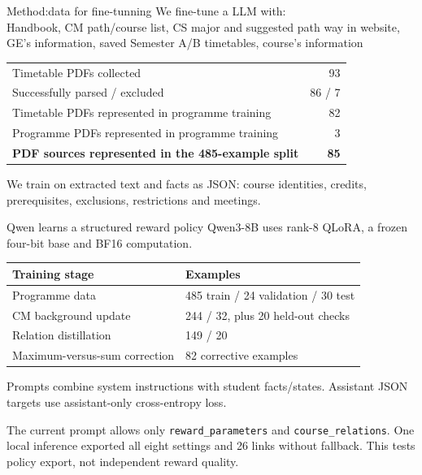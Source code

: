 \documentclass[aspectratio=169,11pt]{beamer}
\newcommand{\smallnote}[1]{\par{\footnotesize\color{muted}#1\par}}
\begin{document}
\begin{frame}{Method:data for fine-tunning}
We fine-tune a LLM with:\\
Handbook, CM path/course list, CS major and suggested path way in website, GE's information, saved Semester A/B timetables, course's information
\vspace{2mm}
\begin{tabular}{L{9.4cm}r}
\toprule
Timetable PDFs collected & 93\\
Successfully parsed / excluded & 86 / 7\\
Timetable PDFs represented in programme training & 82\\
Programme PDFs represented in programme training & 3\\\midrule
\textbf{PDF sources represented in the 485-example split} & \textbf{85}\\
\bottomrule
\end{tabular}\par
\vspace{2mm}
We train on extracted text and facts as JSON: course identities, credits, prerequisites, exclusions, restrictions and meetings.

\end{frame}

\begin{frame}{Qwen learns a structured reward policy}
Qwen3-8B uses rank-8 QLoRA, a frozen four-bit base and BF16 computation.
\vspace{1mm}
\begin{tabular}{L{7.5cm}L{4.8cm}}
\toprule
Training stage & Examples\\\midrule
Programme data & 485 train / 24 validation / 30 test\\
CM background update & 244 / 32, plus 20 held-out checks\\
Relation distillation & 149 / 20\\
Maximum-versus-sum correction & 82 corrective examples\\
\bottomrule
\end{tabular}\par
\vspace{2mm}
Prompts combine system instructions with student facts/states. Assistant JSON targets use assistant-only cross-entropy loss.
\smallnote{The current prompt allows only \texttt{reward\_parameters} and \texttt{course\_relations}. One local inference exported all eight settings and 26 links without fallback. This tests policy export, not independent reward quality.}
\end{frame}
\end{document}
